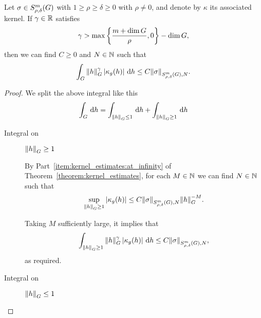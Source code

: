 \begin{lemma}
    Let $\sigma \in \SymbolClass m {\rho, \delta}$ with $1 \geq \rho \geq \delta \geq 0$ with $\rho \neq 0$,
    and denote by $\kappa$ its associated kernel.
    If $\gamma \in \R$ satisfies
    \begin{align*}
        \gamma > \max \left\{\frac {m + \dim \Group} \rho, 0\right\} - \dim \Group,
    \end{align*}
    then we can find $C \geq 0$ and $N \in \N$ such that
    \begin{align*}
        \int_\Group \norm [\Group] h^\gamma \abs {\kappa_g(h)} \dd h
        \leq C \SymbolSemiNorm m {\rho, \delta} N \sigma.
    \end{align*}
\end{lemma}
\begin{proof}
    We split the above integral like this
    \begin{align*}
        \int_\Group \dd h
        = \int_{\norm [\Group] h \leq 1} \dd h
        + \int_{\norm [\Group] h \geq 1} \dd h
    \end{align*}

    \begin{description}
        \item [Integral on] $\norm [\Group] h \geq 1$

            By Part~\eqref{item:kernel_estimates:at_infinity} of
            Theorem~\ref{theorem:kernel_estimates},
            for each $M \in \N$ we can find $N \in \N$ such that
            \begin{align*}
                \sup_{\norm [\Group] {h} \geq 1} \abs {\kappa_g(h)}
                \leq C \SymbolSemiNorm m {\rho, \delta} N \sigma \norm [\Group] h^{-M}.
            \end{align*}

            Taking $M$ sufficiently large, it implies that
            \begin{align*}
                \int_{\norm [\Group] h \geq 1} \norm [\Group] h^\gamma \abs {\kappa_g(h)} \dd h
                \leq C \SymbolSemiNorm m {\rho, \delta} N \sigma,
            \end{align*}
            as required.

        \item [Integral on] $\norm [\Group] h \leq 1$


\end{description}
\end{proof}
